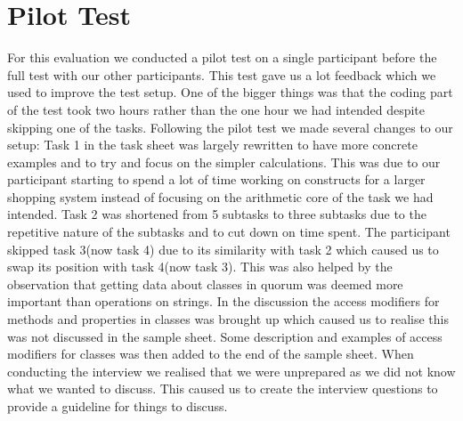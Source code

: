 \section{Pilot Test}
For this evaluation we conducted a pilot test on a single participant before the full test with our other participants.
This test gave us a lot feedback which we used to improve the test setup.
One of the bigger things was that the coding part of the test took two hours rather than the one hour we had intended despite skipping one of the tasks.
Following the pilot test we made several changes to our setup:
Task 1 in the task sheet was largely rewritten to have more concrete examples and to try and focus on the simpler calculations.
This was due to our participant starting to spend a lot of time working on constructs for a larger shopping system instead of focusing on the arithmetic core of the task we had intended.
Task 2 was shortened from 5 subtasks to three subtasks due to the repetitive nature of the subtasks and to cut down on time spent.
The participant skipped task 3(now task 4) due to its similarity with task 2 which caused us to swap its position with task 4(now task 3).
This was also helped by the observation that getting data about classes in quorum was deemed more important than operations on strings.
In the discussion the access modifiers for methods and properties in classes was brought up which caused us to realise this was not discussed in the sample sheet.
Some description and examples of access modifiers for classes was then added to the end of the sample sheet.
When conducting the interview we realised that we were unprepared as we did not know what we wanted to discuss.
This caused us to create the interview questions to provide a guideline for things to discuss.